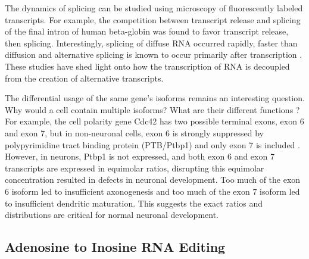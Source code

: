 The dynamics of splicing can be studied using microscopy of fluorescently labeled transcripts. For example, the competition between transcript release and splicing of the final intron of human beta-globin was found to favor transcript release, then splicing. Interestingly, splicing of diffuse RNA occurred rapidly, faster than diffusion \cite{Coulon2014-he} and alternative splicing is known to occur primarily after transcription \cite{Vargas2011-iq}. These studies have shed light onto how the transcription of RNA is decoupled from the creation of alternative transcripts.

The differential usage of the same gene's isoforms remains an interesting question. Why would a cell contain multiple isoforms? What are their different functions \cite{Yap:2016iga}? For example, the cell polarity gene Cdc42 has two possible terminal exons, exon 6 and exon 7, but in non-neuronal cells, exon 6 is strongly suppressed by polypyrimidine tract binding protein (PTB/Ptbp1) and only exon 7 is included \cite{Yap2016-dl}. However, in neurons, Ptbp1 is not expressed, and both exon 6 and exon 7 transcripts are expressed in equimolar ratios, disrupting this equimolar concentration resulted in defects in neuronal development. Too much of the exon 6 isoform led to insufficient axonogenesis and too much of the exon 7 isoform led to insufficient dendritic maturation. This suggests the exact ratios and distributions are critical for normal neuronal development.


\subsection{Adenosine to Inosine RNA Editing}

